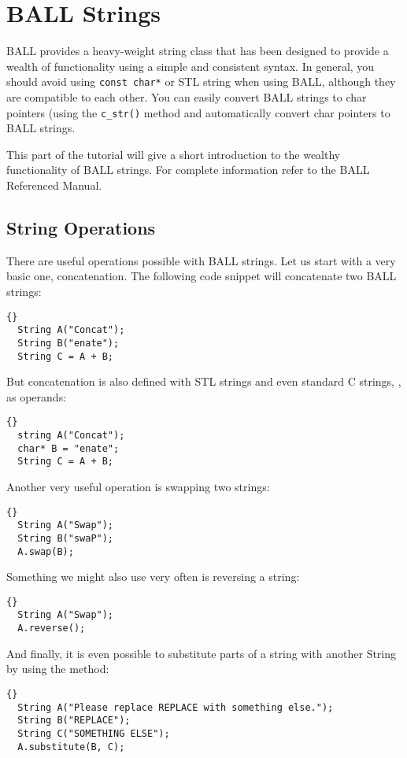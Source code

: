\section{BALL Strings}

BALL provides a heavy-weight string class that has been designed
to provide a wealth of functionality using a simple and consistent syntax.
In general, you should avoid using {\tt const char*} or STL string when using
BALL, although they are compatible to each other. You can easily convert BALL
strings to char pointers (using the {\tt c\_str()} method and automatically
convert char pointers to BALL strings.

This part of the tutorial will give a short introduction to the wealthy
functionality of BALL strings. For complete information refer to the BALL
Referenced Manual.

\subsection{String Operations}

There are useful operations possible with BALL strings. Let us start with a
very basic one, concatenation. The following code snippet will concatenate two
BALL strings:
\begin{lstlisting}{}
  String A("Concat");
  String B("enate");
  String C = A + B;
\end{lstlisting}
But concatenation is also defined with STL strings and even standard C
strings, , as operands:
\begin{lstlisting}{}
  string A("Concat");
  char* B = "enate";
  String C = A + B;
\end{lstlisting}

\noindent
Another very useful operation is swapping two strings:
\begin{lstlisting}{}
  String A("Swap");
  String B("swaP");
  A.swap(B);
\end{lstlisting}

\noindent
Something we might also use very often is reversing a string:
\begin{lstlisting}{}
  String A("Swap");
  A.reverse();
\end{lstlisting}

\noindent
And finally, it is even possible to substitute parts of a string with another
String by using the  method:
\begin{lstlisting}{}
  String A("Please replace REPLACE with something else.");
  String B("REPLACE");
  String C("SOMETHING ELSE");
  A.substitute(B, C);
\end{lstlisting}


